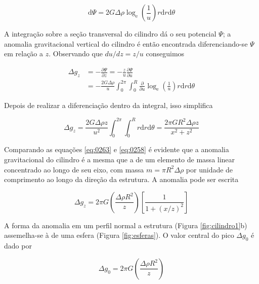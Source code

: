 \documentclass[]{book}
\theoremstyle{definition}
\theoremstyle{definition}
\theoremstyle{definition}
\theoremstyle{remark}
\begin{document}
\begin{equation}
\mathrm{d} \Psi=2 G \Delta \rho \log _{\mathrm{e}}\left(\frac{1}{u}\right) r \mathrm{d} r \mathrm{d} \theta \label{eq:0261}
\end{equation}

A integração sobre a seção transversal do cilindro dá o seu potencial \(\Psi\); a anomalia gravitacional vertical do cilindro é então encontrada diferenciando-se \(\Psi\) em relação a \(z\). Observando que \(du/dz=z/u\) conseguimos

\begin{equation}
\begin{aligned} \Delta g_{z} &=-\frac{\partial \Psi}{\partial z}=-\frac{z}{u} \frac{\partial \Psi}{\partial u} \\ &=-\frac{2 G \Delta \rho}{u} \int_{0}^{2 \pi} \int_{0}^{R} \frac{\partial}{\partial u} \log _{\mathrm{e}}\left(\frac{1}{u}\right) r \mathrm{d} r \mathrm{d} \theta \end{aligned} \label{eq:0262}
\end{equation}

Depois de realizar a diferenciação dentro da integral, isso simplifica

\begin{equation}
\Delta g_{z}=\frac{2 G \Delta \rho z}{u^{2}} \int_{0}^{2 \pi} \int_{0}^{R} r \mathrm{d} r \mathrm{d} \theta=\frac{2 \pi G R^{2} \Delta \rho z}{x^{2}+z^{2}} \label{eq:0263}
\end{equation}

Comparando as equações \eqref{eq:0263} e \eqref{eq:0258} é evidente que a anomalia gravitacional do cilindro é a mesma que a de um elemento de massa linear concentrado ao longo de seu eixo, com massa \(m=\pi R^2\Delta\rho\) por unidade de comprimento ao longo da direção da estrutura. A anomalia pode ser escrita

\begin{equation}
\Delta g_{z}=2 \pi G\left(\frac{\Delta \rho R^{2}}{z}\right)\left[\frac{1}{1+(x / z)^{2}}\right]  \label{eq:0264}
\end{equation}

A forma da anomalia em um perfil normal a estrutura (Figura \ref{fig:cilindro1}b) assemelha-se à de uma esfera (Figura \ref{fig:esferas}). O valor central do pico \(\Delta g_0\) é dado por

\begin{equation}
\Delta g_{0}=2 \pi G\left(\frac{\Delta \rho R^{2}}{z}\right)  \label{eq:0265}
\end{equation}
\end{document}
